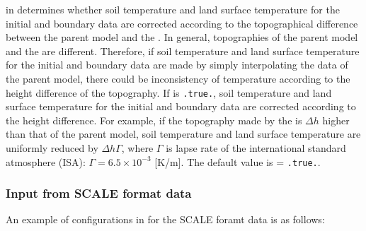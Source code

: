  in  determines
whether soil temperature and land surface temperature for the initial and boundary data are corrected
according to the topographical difference between the parent model and the \scalerm.
In general, topographies of the parent model and the \scalerm are different.
Therefore, if soil temperature and land surface temperature for the initial and boundary data are made by simply interpolating the data of the parent model,
there could be inconsistency of temperature according to the height difference of the topography.
If  is \verb|.true.|,
soil temperature and land surface temperature for the initial and boundary data are corrected according to the height difference.
For example, if the topography made by the \scalerm is $\Delta h$ higher than that of the parent model,
soil temperature and land surface temperature are uniformly reduced by $\Delta h\Gamma$,
where $\Gamma$ is lapse rate of the international standard atmosphere (ISA): $\Gamma=6.5\times 10^{-3}$ [K/m].
The default value is  = \verb|.true.|.

\subsubsection{Input from SCALE format data} \label{sec:datainput_scale}

An example of configurations in  for the SCALE foramt data is as follows:


